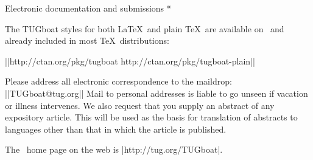 \head * Electronic documentation and submissions *

The TUGboat styles for both \LaTeX\ and plain \TeX\ are available on
\CTAN\ and already included in most \TeX\ distributions:

||http://ctan.org/pkg/tugboat
http://ctan.org/pkg/tugboat-plain||

Please address all electronic correspondence to the \TUB{} maildrop:
||TUGboat@tug.org||
Mail to personal addresses is liable to go unseen if
vacation or illness intervenes.  We also request that you supply
an abstract of any expository article.  This will be used as the
basis for translation of abstracts to languages other than that
in which the article is published.

\smallskip
The \TUB\ home page on the web is |http://tug.org/TUGboat|.

\makesignature

\endarticle
